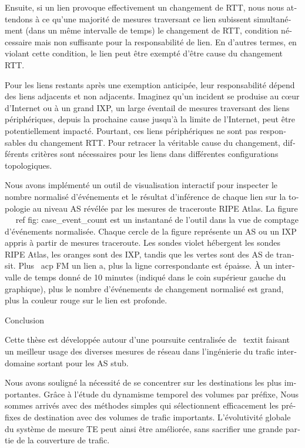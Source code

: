 \begin{otherlanguage}{french}
{{{Ensuite, si un lien provoque effectivement un changement de RTT, nous nous attendons à ce qu'une majorité de mesures traversant ce lien subissent simultanément (dans un même intervalle de temps) le changement de RTT, condition nécessaire mais non suffisante pour la responsabilité de lien. En d'autres termes, en violant cette condition, le lien peut être exempté d'être cause du changement RTT.

Pour les liens restants après une exemption anticipée, leur responsabilité dépend des liens adjacents et non adjacents. Imaginez qu'un incident se produise au cœur d'Internet ou à un grand IXP, un large éventail de mesures traversant des liens périphériques, depuis la prochaine cause jusqu'à la limite de l'Internet, peut être potentiellement impacté. Pourtant, ces liens périphériques ne sont pas responsables du changement RTT.
Pour retracer la véritable cause du changement, différents critères sont nécessaires pour les liens dans différentes configurations topologiques.

Nous avons implémenté un outil de visualisation interactif pour inspecter le nombre normalisé d'événements et le résultat d'inférence de chaque lien sur la topologie au niveau AS révélée par les mesures de traceroute RIPE Atlas.
La figure ~ \ ref {fig: case_event_count} est un instantané de l'outil dans la vue de comptage d'événements normalisée.
Chaque cercle de la figure représente un AS ou un IXP appris à partir de mesures traceroute. Les sondes violet hébergent les sondes RIPE Atlas, les oranges sont des IXP, tandis que les vertes sont des AS de transit. Plus \ acp {FM} un lien a, plus la ligne correspondante est épaisse. À un intervalle de temps donné de 10 minutes (indiqué dans le coin supérieur gauche du graphique), plus le nombre d'événements de changement normalisé est grand, plus la couleur rouge sur le lien est profonde.

Conclusion

Cette thèse est développée autour d'une poursuite centralisée de \ textit {faisant un meilleur usage des diverses mesures de réseau dans l'ingénierie du trafic interdomaine sortant pour les AS stub}.

Nous avons souligné la nécessité de se concentrer sur les destinations les plus importantes.
Grâce à l'étude du dynamisme temporel des volumes par préfixe,
Nous sommes arrivés avec des méthodes simples qui sélectionnent efficacement les préfixes de destination avec des volumes de trafic importants.
L'évolutivité globale du système de mesure TE peut ainsi être améliorée, sans sacrifier une grande partie de la couverture de trafic.

}}}
\end{otherlanguage}
